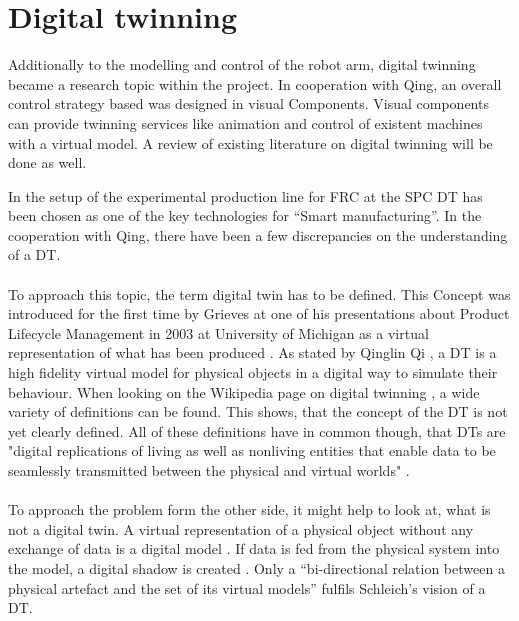 \chapter{Digital twinning}

Additionally to the modelling and control of the robot arm, digital twinning became a research topic within the project. In cooperation with Qing, an overall control strategy based was designed in visual Components. Visual components can provide twinning services like animation and control of existent machines with a virtual model.
A review of existing literature on digital twinning will be done as well.\\
\medskip


In the setup of the experimental production line for \ac{FRC} at the \ac{SPC} 
\ac{DT} has been chosen as one of the key technologies for “Smart manufacturing”. In the cooperation with Qing, there have been a few discrepancies on the understanding of a \ac{DT}.\\
\\
To approach this topic, the term digital twin has to be defined.
This Concept was introduced for the first time by Grieves at one of his presentations about Product Lifecycle Management in 2003 at University of Michigan as a virtual representation of what has been produced \cite{GreivesDTfirst}.
As stated by Qinglin Qi \cite{Qi2018DigitalTS}, a \ac{DT} is a high fidelity virtual model for physical objects in a digital way to simulate their behaviour. 
When looking on the Wikipedia page on digital twinning \cite{DTwikip}, a wide variety of definitions can be found. 
This shows, that the concept of the \ac{DT} is not yet clearly defined. All of these definitions have in common though, that \acp{DT} are "digital replications of living as well as nonliving entities that 
enable data to be seamlessly transmitted between the physical and virtual worlds" \cite{SaddikDTmultimconv}.\\
\\
To approach the problem form the other side, it might help to look at, what is not a digital twin.
A virtual representation of a physical object without any exchange of data is a digital model \cite{WongWhatisDT}. 
If data is fed from the physical system into the model, a digital shadow is created \cite{KRITZINGER20181016}.
Only a “bi-directional relation between a physical artefact and the set of its virtual models” \cite{SchleichDTshaping} fulfils Schleich's vision of a \ac{DT}.\\
\\
